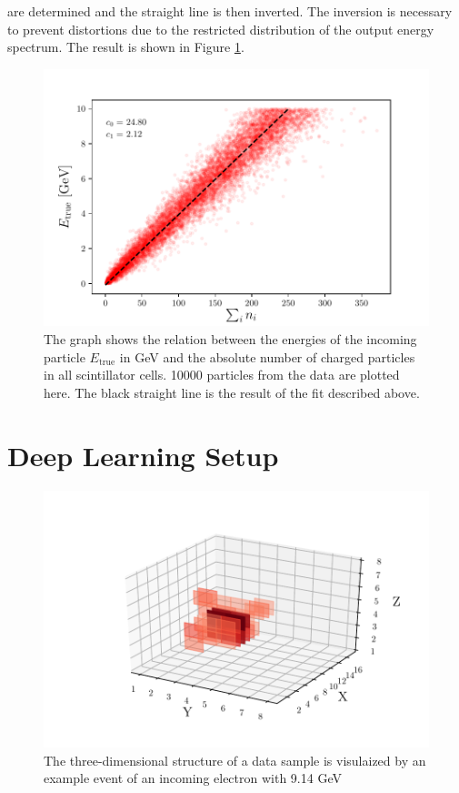 \documentclass[12pt, a4paper]{thesis}
\begin{document}
are determined and the straight line is then inverted. The inversion
is necessary to prevent distortions due to the restricted distribution
of the output energy spectrum. The result is shown in Figure
\ref{e-vs-sum_n_fit}.


\begin{figure}[H]
\centering
\includegraphics[width=.9\linewidth]{../images/e-vs-sum_n_fit.pdf}
\caption{ The graph shows the relation between the energies of the
  incoming particle \(E_{\text{true}}\) in GeV and the absolute number
  of charged particles in all scintillator cells.  10000 particles
  from the data are plotted here. The black straight line is the
  result of the fit described above.}
\label{e-vs-sum_n_fit}
\end{figure}

\section{Deep Learning Setup}
\label{sec:orgb3e1899}

\begin{figure}[H]
  \centering
  \includegraphics[width=.9\linewidth]{../images/data_display.pdf}
  \caption{The three-dimensional structure of a data sample is
    visulaized by an example event of an incoming electron with
    9.14 GeV}
  \label{data_display}
\end{figure}
\end{document}
